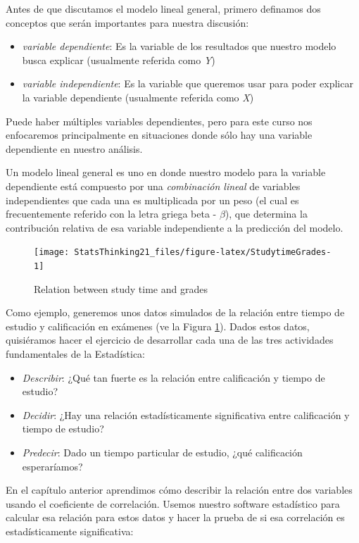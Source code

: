\documentclass[
  12pt,
]{book}
\providecommand{\tightlist}{%
  \setlength{\itemsep}{0pt}\setlength{\parskip}{0pt}}
\begin{document}
Antes de que discutamos el modelo lineal general, primero definamos dos conceptos que serán importantes para nuestra discusión:

\begin{itemize}
\tightlist
\item
  \emph{variable dependiente}: Es la variable de los resultados que nuestro modelo busca explicar (usualmente referida como \emph{Y})
\item
  \emph{variable independiente}: Es la variable que queremos usar para poder explicar la variable dependiente (usualmente referida como \emph{X})
\end{itemize}

Puede haber múltiples variables dependientes, pero para este curso nos enfocaremos principalmente en situaciones donde sólo hay una variable dependiente en nuestro análisis.

Un modelo lineal general es uno en donde nuestro modelo para la variable dependiente está compuesto por una \emph{combinación lineal} de variables independientes que cada una es multiplicada por un peso (el cual es frecuentemente referido con la letra griega beta - \(\beta\)), que determina la contribución relativa de esa variable independiente a la predicción del modelo.

\begin{figure}
\texttt{[image: StatsThinking21\_files/figure-latex/StudytimeGrades-1]} \caption{Relation between study time and grades}\label{fig:StudytimeGrades}
\end{figure}

Como ejemplo, generemos unos datos simulados de la relación entre tiempo de estudio y calificación en exámenes (ve la Figura \ref{fig:StudytimeGrades}). Dados estos datos, quisiéramos hacer el ejercicio de desarrollar cada una de las tres actividades fundamentales de la Estadística:

\begin{itemize}
\tightlist
\item
  \emph{Describir}: ¿Qué tan fuerte es la relación entre calificación y tiempo de estudio?
\item
  \emph{Decidir}: ¿Hay una relación estadísticamente significativa entre calificación y tiempo de estudio?
\item
  \emph{Predecir}: Dado un tiempo particular de estudio, ¿qué calificación esperaríamos?
\end{itemize}

En el capítulo anterior aprendimos cómo describir la relación entre dos variables usando el coeficiente de correlación. Usemos nuestro software estadístico para calcular esa relación para estos datos y hacer la prueba de si esa correlación es estadísticamente significativa:
\end{document}
